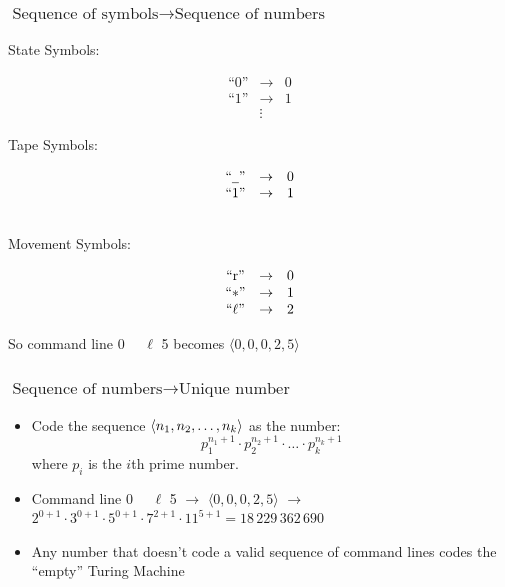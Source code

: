 \begin{frame}
\frametitle{$\text{Sequence of symbols} \rightarrow \text{Sequence of numbers}$}

\begin{multicols}{3}

\begin{center}State Symbols:
\end{center}
\[
\begin{array}{ccc}
\text{``0''} &\rightarrow &\text{0}\\
\text{``1''} &\rightarrow &\text{1}\\
 &\vdots &
\end{array}
\]

\pause

\columnbreak

\begin{center}Tape Symbols:
\end{center}
\[
\begin{array}{ccc}
\text{``\ensuremath{\underline{\enspace}}''} &\rightarrow &\text{0}\\
\text{``$1$''} &\rightarrow &\text{1}\\
\
\end{array}
\]

\columnbreak

\pause
\begin{center}Movement Symbols: \vspace{-2em}
\end{center}
\[
\begin{array}{ccc}
\text{``r''} &\rightarrow &\text{0}\\
\text{``$*$''} &\rightarrow &\text{1}\\
``\ell\text{''} &\rightarrow &\text{2}
\end{array}
\]

\end{multicols}
\pause

So command line 0 \ub \, \ub \, $\ell$ 5 becomes $\langle 0, 0, 0, 2, 5 \rangle$
\end{frame}

\begin{frame}
\frametitle{$ \text{Sequence of numbers} \rightarrow  \text{Unique number}$}

\begin{itemize}[<+->]

\item Code the sequence  \(\left\langle {n_1, n_2, \ldots, n_k} \right\rangle\) as the number: \[p_{1}^{n_{1}+1}\cdot p_2^{n_2+1}\cdot\ldots\cdot p_k^{n_k+1}\] where \(p_i\) is the \(i\)th prime number.  

\item Command line 0 \ub \, \ub \, $\ell$ 5 $\rightarrow$ $\langle 0, 0, 0, 2, 5 \rangle$ $\rightarrow$ $ 2^{0+1}\cdot 3^{0+1}\cdot 5^{0+1}\cdot 7^{2+1}\cdot 11^{5+1}=18\,229\,362\,690$

\item Any number that doesn't code a valid sequence of command lines codes the ``empty'' Turing Machine 

\end{itemize}
\end{frame}

